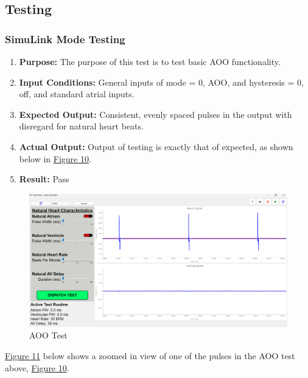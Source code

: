 \documentclass{article}
\newcounter{subsubsubsection}[subsubsection]
\begin{document}
\newpage
\subsection{Testing}

\subsubsection{SimuLink Mode Testing}


\begin{enumerate}[label=]
   \item \textbf{Purpose:} The purpose of this test is to test basic AOO functionality.
   \item \textbf{Input Conditions:} General inputs of mode = 0, AOO, and hysteresis = 0, off, and standard 
   atrial inputs. 
   \item \textbf{Expected Output:} Consistent, evenly spaced pulses in the output with disregard for natural heart beats.
   \item \textbf{Actual Output:} Output of testing is exactly that of expected, as shown below in \hyperref[AOOtest]{Figure 10}.
   \item \textbf{Result:} Pass
\end{enumerate}

\begin{tcolorbox}
    \begin{figure}[H]        
        \label{AOOtest}
        \includegraphics[width=\textwidth]{AOOtest1.png}
        \caption{AOO Test}
    \end{figure}
\end{tcolorbox}

\newpage
\hyperref[AOOpulse]{Figure 11} below shows a zoomed in view of one of the pulses in the AOO test above, \hyperref[AOOtest]{Figure 10}. 
\end{document}
